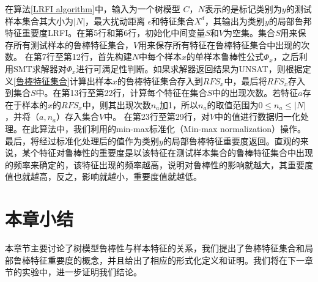 在算法\ref{LRFI algorithm}中，输入为一个树模型 $C$，$N$表示的是标记类别为$y$的测试样本集合其大小为$|N|$，最大扰动距离 $\epsilon$和特征集合$X^d$，其输出为类别$y$的局部鲁邦特征重要度LRFI。在第5行和第6行，初始化中间变量$S$和$V$为空集。集合$S$用来保存所有测试样本的鲁棒特征集合，$V$用来保存所有特征在鲁棒特征集合中出现的次数。 在第7行至第12行，首先构建$N$中每个样本$x$的单样本鲁棒性公式$\Phi_x$，之后利用SMT求解器对$\Phi_x$进行可满足性判断。如果求解器返回结果为UNSAT，则根据定义\ref{鲁棒特征集合}计算出样本$x$的鲁棒特征集合存入到$RFS_x$中，最后将$RFS_x$存入到集合$S$中。在第13行至第22行，计算每个特征在集合$S$中的出现次数。若特征$a$存在于样本的$x$的$RFS_x$中，则其出现次数$n_a$加1，所以$n_a$的取值范围为$0\le n_a \le |N|$，并将（$a,n_a$）存入集合$V$中。 在第23行至第29行，对$V$中的值进行数据归一化处理。在此算法中，我们利用的min-max标准化（Min-max normalization）操作。最后，将经过标准化处理后的值作为类别$y$的局部鲁棒特征重要度返回。直观的来说，某个特征对鲁棒性的重要度是以该特征在测试样本集合的鲁棒特征集合中出现的频率来确定的，该特征出现的频率越高，说明对鲁棒性的影响就越大，其重要度值也就越高，反之，影响就越小，重要度值就越低。
\section{本章小结}

本章节主要讨论了树模型鲁棒性与样本特征的关系，我们提出了鲁棒特征集合和局部鲁棒特征重要度的概念，并且给出了相应的形式化定义和证明。我们将在下一章节的实验中，进一步证明我们结论。










































